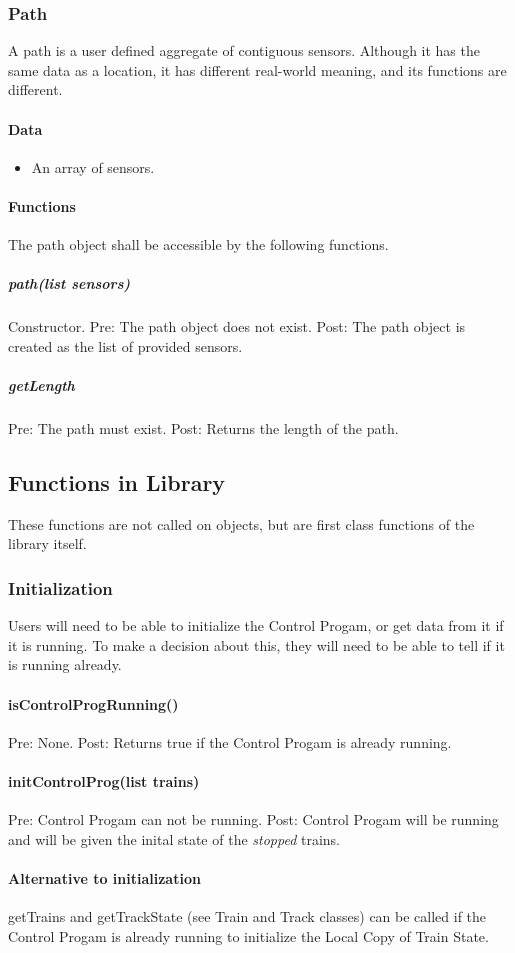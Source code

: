 \documentclass[a4paper,11pt,notitlepage]{article}
\def\CS{Control Progam\xspace} \def\LC{Local Copy of Train State\xspace} \def\TN{Track Node\xspace}
\begin{document}
\subsubsection{Path}
A path is a user defined aggregate of contiguous sensors. Although it has the same data as a location, it has different real-world meaning, and its functions are different.
\paragraph{Data}
\begin{itemize}
\item An array of sensors.
\end{itemize}
\paragraph{Functions}
The path object shall be accessible by the following functions.
\subparagraph{path(list sensors)} Constructor. Pre: The path object does not exist. Post: The path object is created as the list of provided sensors.
\subparagraph{getLength} Pre: The path must exist. Post: Returns the length of the path.


\subsection{Functions in Library}
These functions are not called on objects, but are first class functions of the library itself.

\subsubsection{Initialization}
Users will need to be able to initialize the \CS, or get data from it if it is running. To make a decision about this, they will need to be able to tell if it is running already.
\paragraph{isControlProgRunning()} Pre: None. Post: Returns true if the \CS is already running.
\paragraph{initControlProg(list trains)} Pre: \CS can not be running. Post: \CS will be running and will be given the inital state of the \emph{stopped} trains.
\paragraph{Alternative to initialization} getTrains and getTrackState (see Train and Track classes) can be called if the \CS is already running to initialize the \LC.
\end{document}
